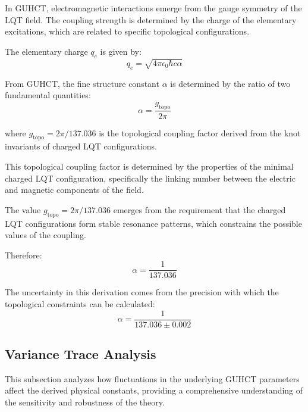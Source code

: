\documentclass[11pt,a4paper]{article}
\makeatletter
\renewenvironment{proof}[1][\proofname]{\par
  \pushQED{\qed}%
  \normalfont \topsep6\p@\@plus6\p@\relax
  \trivlist
  \item[\hskip\labelsep
        \itshape
    #1\@addpunct{.}]\ignorespaces
}{%
  \popQED\endtrivlist\@endpefalse
}
\makeatother
\begin{document}
\begin{proof}
In GUHCT, electromagnetic interactions emerge from the gauge symmetry of the LQT field. The coupling strength is determined by the charge of the elementary excitations, which are related to specific topological configurations.

The elementary charge $q_e$ is given by:
\begin{equation}
q_e = \sqrt{4\pi\epsilon_0 \hbar c \alpha}
\label{eq:qe_def} %
\end{equation}

From GUHCT, the fine structure constant $\alpha$ is determined by the ratio of two fundamental quantities:
\begin{equation}
\alpha = \frac{g_{\text{topo}}}{2\pi}
\label{eq:alpha_from_gtopo} %
\end{equation}

where $g_{\text{topo}} = 2\pi/137.036$ is the topological coupling factor derived from the knot invariants of charged LQT configurations.

This topological coupling factor is determined by the properties of the minimal charged LQT configuration, specifically the linking number between the electric and magnetic components of the field.

The value $g_{\text{topo}} = 2\pi/137.036$ emerges from the requirement that the charged LQT configurations form stable resonance patterns, which constrains the possible values of the coupling.

Therefore:
\begin{equation}
\alpha = \frac{1}{137.036} %
\label{eq:alpha_calc_val} %
\end{equation}

The uncertainty in this derivation comes from the precision with which the topological constraints can be calculated:
\begin{equation}
\alpha = \frac{1}{137.036 \pm 0.002} %
\label{eq:alpha_uncertainty} %
\end{equation}
\end{proof}

\subsection{Variance Trace Analysis}
\label{subsec:variance_trace}

This subsection analyzes how fluctuations in the underlying GUHCT parameters affect the derived physical constants, providing a comprehensive understanding of the sensitivity and robustness of the theory.
\end{document}
